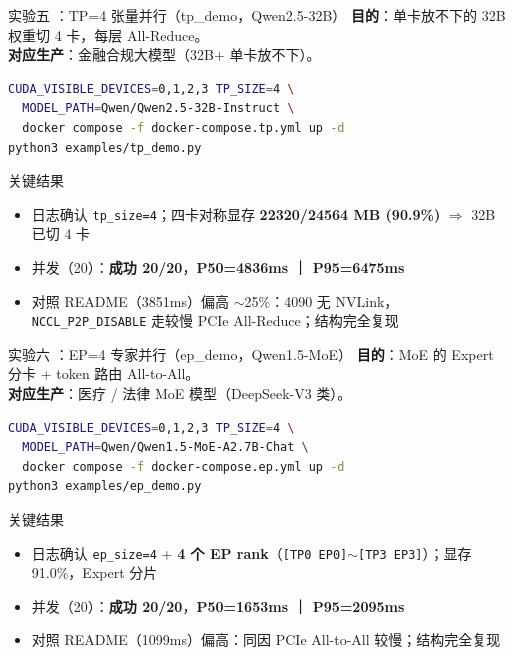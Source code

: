 \documentclass[aspectratio=169,11pt]{beamer}
\newcommand{\gc}[1]{\texttt{\small #1}}   %
\newcommand{\cnum}[1]{\tikz[baseline=(c.base)]{\node[draw,circle,inner sep=1.2pt,line width=0.5pt](c){\scriptsize #1};}}
\begin{document}
\begin{frame}[fragile]{实验五 \cnum{5}：TP=4 张量并行（tp\_demo，Qwen2.5-32B）}
\textbf{目的}：单卡放不下的 32B 权重切 4 卡，每层 All-Reduce。\\
\textbf{对应生产}：金融合规大模型（32B+ 单卡放不下）。
\vspace{1mm}
\begin{lstlisting}[language=bash]
CUDA_VISIBLE_DEVICES=0,1,2,3 TP_SIZE=4 \
  MODEL_PATH=Qwen/Qwen2.5-32B-Instruct \
  docker compose -f docker-compose.tp.yml up -d
python3 examples/tp_demo.py
\end{lstlisting}
\begin{block}{关键结果}
\small
\begin{itemize}
  \item 日志确认 \gc{tp\_size=4}；四卡对称显存 \textbf{22320/24564 MB (90.9\%)} $\Rightarrow$ 32B 已切 4 卡
  \item 并发（20）：\textbf{成功 20/20}，\textbf{P50=4836ms ｜ P95=6475ms}
  \item 对照 README（3851ms）偏高 $\sim$25\%：4090 无 NVLink，\gc{NCCL\_P2P\_DISABLE} 走较慢 PCIe All-Reduce；结构完全复现
\end{itemize}
\end{block}
\end{frame}

\begin{frame}[fragile]{实验六 \cnum{6}：EP=4 专家并行（ep\_demo，Qwen1.5-MoE）}
\textbf{目的}：MoE 的 Expert 分卡 + token 路由 All-to-All。\\
\textbf{对应生产}：医疗 / 法律 MoE 模型（DeepSeek-V3 类）。
\vspace{1mm}
\begin{lstlisting}[language=bash]
CUDA_VISIBLE_DEVICES=0,1,2,3 TP_SIZE=4 \
  MODEL_PATH=Qwen/Qwen1.5-MoE-A2.7B-Chat \
  docker compose -f docker-compose.ep.yml up -d
python3 examples/ep_demo.py
\end{lstlisting}
\begin{block}{关键结果}
\small
\begin{itemize}
  \item 日志确认 \gc{ep\_size=4} + \textbf{4 个 EP rank}（\gc{[TP0 EP0]}$\sim$\gc{[TP3 EP3]}）；显存 91.0\%，Expert 分片
  \item 并发（20）：\textbf{成功 20/20}，\textbf{P50=1653ms ｜ P95=2095ms}
  \item 对照 README（1099ms）偏高：同因 PCIe All-to-All 较慢；结构完全复现
\end{itemize}
\end{block}
\end{frame}
\end{document}

